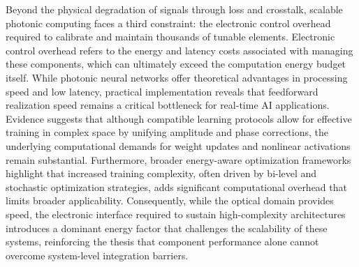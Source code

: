 Beyond the physical degradation of signals through loss and crosstalk, scalable photonic computing faces a third constraint: the electronic control overhead required to calibrate and maintain thousands of tunable elements. Electronic control overhead refers to the energy and latency costs associated with managing these components, which can ultimately exceed the computation energy budget itself. \citep{doi_10_1364_oe_26_010914_a68558fb} \citep{doi_10_1109_jphot_2026_3695696_63cd0e68} While photonic neural networks offer theoretical advantages in processing speed and low latency, practical implementation reveals that feedforward realization speed remains a critical bottleneck for real-time AI applications. Evidence suggests that although compatible learning protocols allow for effective training in complex space by unifying amplitude and phase corrections, the underlying computational demands for weight updates and nonlinear activations remain substantial. Furthermore, broader energy-aware optimization frameworks highlight that increased training complexity, often driven by bi-level and stochastic optimization strategies, adds significant computational overhead that limits broader applicability. Consequently, while the optical domain provides speed, the electronic interface required to sustain high-complexity architectures introduces a dominant energy factor that challenges the scalability of these systems, reinforcing the thesis that component performance alone cannot overcome system-level integration barriers. \citep{doi_10_55041_ijsrem43509_b9a7bd5e} \citep{s2_b765388f3cc18d6e5a0507522822def0e3503ec6_fa09b483}

